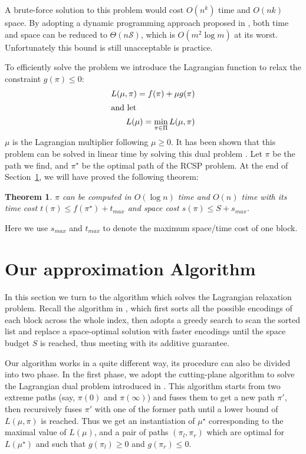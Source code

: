 \documentclass{sig-alternate-05-2015}
\begin{document}
A brute-force solution to this problem would cost $ O(n^k) $ time and $ O(nk) $ space.
By adopting a dynamic programming approach proposed in \cite{lawler2001combinatorial}, both time and space can be reduced to $ \Theta(n\mathcal{S}) $, which is $ O(m^{2}\log m) $ at its worst.
Unfortunately this bound is still unacceptable is practice.

To efficiently solve the problem we introduce the Lagrangian function to relax the constraint $ g(\pi) \leqslant 0 $:
\begin{align}
L(\mu,\pi) = f(\pi)+\mu g(\pi) \label{equ: L(u,pi)} \\ 
\intertext{and let}
L(\mu) = \min_{\pi \in \Pi} L(\mu,\pi) \label{equ: L(u)}
\end{align}
\noindent $ \mu $ is the Lagrangian multiplier following $ \mu \geqslant 0 $.
It has been shown that this problem can be solved in linear time by solving this dual problem \cite{handler1980dual}.
Let $ \pi $ be the path we find, and $ \pi^\star $ be the optimal path of the RCSP problem.
At the end of Section~\ref{sec: our alg}, we will have proved the following theorem:
\newtheorem{theorem}{Theorem}
\begin{theorem}
	$ \pi $ can be computed in $ O(\log n) $ time and $ O(n) $ time with its time cost $ t(\pi) \leqslant f(\pi^\star) + t_{max} $ and space cost $ s(\pi) \leqslant S + s_{max} $.
\end{theorem}
Here we use $ s_{max} $ and $ t_{max} $ to denote the maximum space/time cost of one block.

\section{Our approximation Algorithm}\label{sec: our alg}
In this section we turn to the algorithm which solves the Lagrangian relaxation problem.
Recall the algorithm in \cite{ottaviano2015optimal}, which first sorts all the possible encodings of each block across the whole index, then adopts a greedy search to scan the sorted list and replace a space-optimal solution with faster encodings until the space budget $ S $ is reached, thus meeting with its additive guarantee.

Our algorithm works in a quite different way, its procedure can also be divided into two phase.
In the first phase, we adopt the cutting-plane algorithm to solve the Lagrangian dual problem introduced in \cite{handler1980dual}.
This algorithm starts from two extreme paths (say, $ \pi(0) $ and $ \pi(\infty) $) and fuses them to get a new path $ \pi' $, then recursively fuses $ \pi' $ with one of the former path until
a lower bound of $ L(\mu,\pi) $ is reached.
Thus we get an instantiation of $ \mu^\star $ corresponding to the maximal value of $ L(\mu) $, and a pair of paths $ (\pi_l,\pi_r) $ which are optimal for $ L(\mu^\star) $ and such that $ g(\pi_l) \geqslant 0 $ and $ g(\pi_r) \leqslant 0 $.
\end{document}
